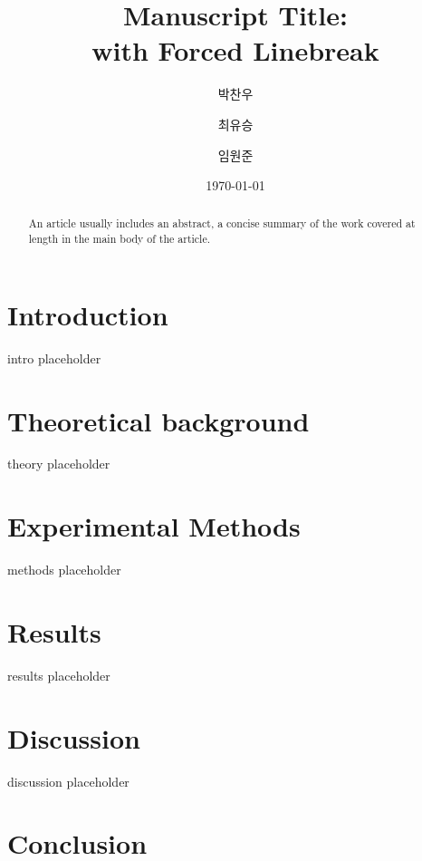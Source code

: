 \documentclass[%
 reprint,
 amsmath,amssymb,
 aps,
]{revtex4-2}
\begin{document}

\title{Manuscript Title:\\with Forced Linebreak}

\author{박찬우}
\author{최유승}
\author{임원준}

\date{\today}

\begin{abstract}
An article usually includes an abstract, a concise summary of the work
covered at length in the main body of the article. 
\end{abstract}

\maketitle


\section{\label{sec:intro}Introduction}

intro placeholder

\section{\label{sec:theory}Theoretical background}

theory placeholder

\section{\label{sec:methods}Experimental Methods}

methods placeholder

\section{\label{sec:results}Results}

results placeholder

\section{\label{sec:discussion}Discussion}

discussion placeholder

\section{\label{sec:conclusion}Conclusion}
\end{document}
